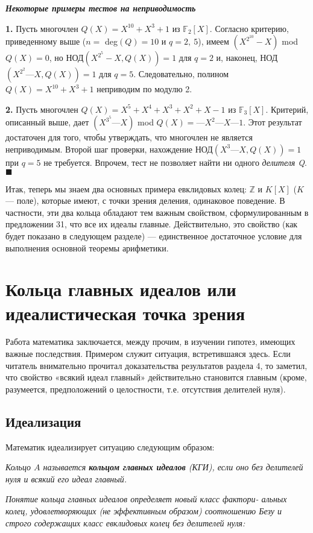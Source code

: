 \documentclass{mai_book}
\begin{document}
\noindent\textbf{\textit{Некоторые примеры тестов на неприводимость}}

\textbf{1.} Пусть многочлен $Q(X) = X^{10} + X^3 + 1$ из $\mathbb{F}_2[X]$. Согласно  
критерию, приведенному выше ($n = $ deg$(Q) = 10$ и $q = 2,\: 5$), имеем 
$(X^{2^{10}} - X)$ mod $Q(X) = 0$, но НОД$(X^{2^5} - X,Q(X)) = 1$ для $q = 2$ и, 
наконец, НОД$(X^{2^2} — X, Q(X)) = 1$ для $q = 5$. Следовательно, полином 
$Q(X) = X^{10} + X^3 + 1$ неприводим по модулю 2.
\newpage

\textbf{2.}  Пусть многочлен $Q(X) = X^5 + X^4 + X^3 + X^2 + X - 1$ из $\mathbb{F}_3[X]$. 
Критерий, описанный выше, дает $(X^{3^5} — X)$ mod $Q(X) = —X^2 — X — 1$. 
Этот результат достаточен для того, чтобы утверждать, что  
многочлен не является неприводимым. Второй шаг проверки, нахождение 
НОД$(X^3 — X, Q(X)) = 1$ при $q = 5$ не требуется. Впрочем, тест не 
позволяет найти ни одного \textit{делителя Q}.\hspace{13.1cm}$\blacksquare$\newline


Итак, теперь мы знаем два основных примера евклидовых колец: $\mathbb{Z}$ 
и $K[X]$ ($K$ — поле), которые имеют, с точки зрения деления,  
одинаковое поведение. В частности, эти два кольца обладают тем важным 
свойством, сформулированным в предложении 31, что все их идеалы 
главные. Действительно, это свойство (как будет показано в следующем 
разделе) — единственное достаточное условие для выполнения  
основной теоремы арифметики.

\section{Кольца главных идеалов или идеалистическая точка зрения}
Работа математика заключается, между прочим, в изучении гипотез, 
имеющих важные последствия. Примером служит ситуация,  
встретившаяся здесь. Если читатель внимательно прочитал доказательства  
результатов раздела 4, то заметил, что свойство «всякий идеал главный» 
действительно становится главным (кроме, разумеется, предположений 
о целостности, т.е. отсутствия делителей нуля). 

\subsection{Идеализация}
Математик идеализирует ситуацию следующим образом:

\begin{determ}
\hspace*{15pt}\textit{Кольцо $A$ называется \textbf{кольцом главных идеалов} (КГИ), если оно 
без делителей нуля и всякий его идеал главный.}
 
\textit{Понятие кольца главных идеалов определяет новый класс фактори- 
альных колец, удовлетворяющих (не эффективным образом)  
соотношению Безу и строго содержащих класс евклидовых колец без делителей 
нуля:} 
\end{determ}
\end{document}
